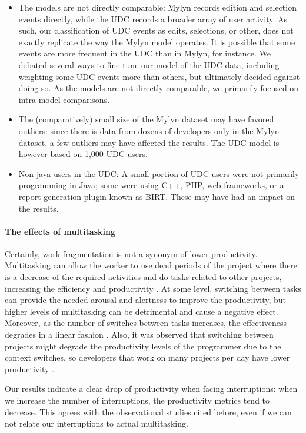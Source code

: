 \documentclass[times]{smrauth}
\begin{document}
\begin{itemize}
\item The models are not directly comparable: Mylyn records edition and selection events directly, while the UDC records a broader array of user activity. As such, our classification of UDC events as edits, selections, or other, does not exactly replicate the way the Mylyn model operates. It is possible that some events are more frequent in the UDC than in Mylyn, for instance. We debated several ways to fine-tune our model of the UDC data, including weighting some UDC events more than others, but ultimately decided against doing so. As the models are not directly comparable, we primarily focused on intra-model comparisons.
\item The (comparatively) small size of the Mylyn dataset may have favored outliers: since there is data from dozens of developers only in the Mylyn dataset, a few outliers may have affected the results. The UDC model is however based on 1,000 UDC users.
\item Non-java users in the UDC: A small portion of UDC users were not primarily programming in Java; some were using C++, PHP, web frameworks, or a report generation plugin known as BIRT. These may have had an impact on the results.
\end{itemize}

\paragraph{The effects of multitasking}

Certainly, work fragmentation is not a synonym of lower productivity. Multitasking can allow the worker to use dead periods of the project where there is a decrease of the required activities and do tasks related to other projects, increasing the efficiency and productivity \cite{ABV12}. At some level, switching between tasks can provide the needed arousal and alertness to improve the productivity, but higher levels of multitasking can be detrimental and cause a negative effect. Moreover, as the number of switches between tasks increases, the effectiveness degrades in a linear fashion \cite{AB12}. Also, it was observed that switching between projects might degrade the productivity levels of the programmer due to the context switches, so developers that work on many projects per day have lower productivity \cite{VBX16}.

Our results indicate a clear drop of productivity when facing interruptions: when we increase the number of interruptions, the productivity metrics tend to decrease. This agrees with the observational studies cited before, even if we can not relate our interruptions to actual multitasking.
\end{document}
